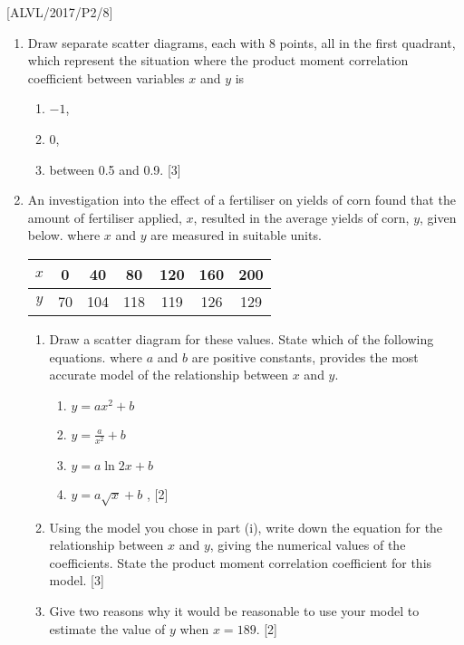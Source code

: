 \item {[}ALVL/2017/P2/8{]}
\begin{enumerate}
\item Draw separate scatter diagrams, each with 8 points, all in the first
quadrant, which represent the situation where the product moment correlation
coefficient between variables $x$ and $y$ is 
\begin{enumerate}
\item $-1$, 
\item 0, 
\item between 0.5 and 0.9.\hfill{} {[}3{]}
\end{enumerate}
\item An investigation into the effect of a fertiliser on yields of corn
found that the amount of fertiliser applied, $x$, resulted in the
average yields of corn, $y$, given below. where $x$ and $y$ are
measured in suitable units. 
\noindent \begin{center}
\begin{tabular}{|c|c|c|c|c|c|c|}
\hline 
$x$ & 0 & 40 & 80 & 120 & 160 & 200\tabularnewline
\hline 
$y$ & 70 & 104 & 118 & 119 & 126 & 129\tabularnewline
\hline 
\end{tabular}
\par\end{center}
\begin{enumerate}
\item Draw a scatter diagram for these values. State which of the following
equations. where $a$ and $b$ are positive constants, provides the
most accurate model of the relationship between $x$ and $y$. 
\begin{enumerate}
\item $y=ax^{2}+b$
\item $y=\frac{a}{x^{2}}+b$
\item $y=a\ln2x+b$
\item $y=a\sqrt{x}+b$ ,\hfill{} {[}2{]}
\end{enumerate}
\item Using the model you chose in part (i), write down the equation for
the relationship between $x$ and $y$, giving the numerical values
of the coefficients. State the product moment correlation coefficient
for this model. {[}3{]} 
\item Give two reasons why it would be reasonable to use your model to estimate
the value of $y$ when $x=189$. \hfill{}{[}2{]}
\end{enumerate}
\end{enumerate}
